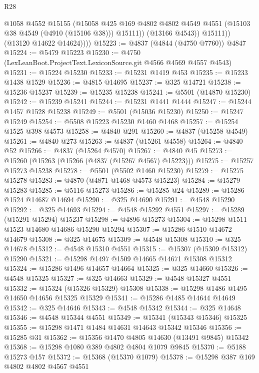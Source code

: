 \begin{lexlean}{R28}
\begin{coremodule}
                  @1058
                  @4552
                  @15155
                  (@15058
                    @425
                    @169
                    @4802
                    @4802
                    @4549
                    @4551
                    (@15103 @38 @4549 (@4910 (@15106 @38)))
                    @15111))
                (@13166 @4543))
              @15111))
          (@13120 @14622 @14624))))
@15223 := @4837 (@4844 (@4750 @7760)) @4847
@15224 := @5479 @15223
@15230 := @4750 (LexLeanBoot.ProjectText.LexiconSource.git @4566 @4569 @4557 @4543)
@15231 := @15224 @15230
@15233 := @15231 @1419 @453
@15235 := @15233 @1438 @1529
@15236 := @4815 @14695
@15237 := @325 @14721
@15238 := @15236 @15237
@15239 := @15235 @15238
@15241 := @5501 (@14870 @15230)
@15242 := @15239 @15241
@15244 := @15231 @1441 @1444
@15247 := @15244 @1457 @1528 @15238
@15249 := @5501 (@15036 @15230)
@15250 := @15247 @15249
@15254 := @5508 @15223 @15230 @1460 @1468
@15257 := @15254 @1525 @398 @4573
@15258 := @4840 @291
@15260 := @4837 (@15258 @4549)
@15261 := @4840 @273
@15263 := @4837 (@15261 @4558)
@15264 := @4840 @52
@15266 := @4837 (@15264 @4570)
@15267 := @4840 @45
@15273 := @15260 (@15263 (@15266 (@4837 (@15267 @4567) @15223)))
@15275 := @15257 @15273 @15238
@15278 := @5501 (@5502 @1460 @15230)
@15279 := @15275 @15278
@15283 := @4870 (@4871 @1468 @4573 @15223)
@15284 := @15279 @15283
@15285 := @5116 @15273
@15286 := @15285 @24
@15289 := @15286 @1524 @14687 @14694
@15290 := @325 @14690
@15291 := @4548 @15290
@15292 := @325 @14693
@15294 := @4548 @15292 @4551
@15297 := @15289 (@15291 @15294) @15237
@15298 := @4896 @15273
@15304 := @15298 @1511 @1523 @14680 @14686 @15290 @15294
@15307 := @15286 @1510 @14672 @14679
@15308 := @325 @14675
@15309 := @4548 @15308
@15310 := @325 @14678
@15312 := @4548 @15310 @4551
@15315 := @15307 (@15309 @15312) @15290
@15321 := @15298 @1497 @1509 @14665 @14671 @15308 @15312
@15324 := @15286 @1496 @14657 @14664
@15325 := @325 @14660
@15326 := @4548 @15325
@15327 := @325 @14663
@15329 := @4548 @15327 @4551
@15332 := @15324 (@15326 @15329) @15308
@15338 := @15298 @1486 @1495 @14650 @14656 @15325 @15329
@15341 := @15286 @1485 @14644 @14649
@15342 := @325 @14646
@15343 := @4548 @15342
@15344 := @325 @14648
@15346 := @4548 @15344 @4551
@15349 := @15341 (@15343 @15346) @15325
@15355 := @15298 @1471 @1484 @14631 @14643 @15342 @15346
@15356 := @15285 @31
@15362 := @15356 @1470 @4805 @14630 (@13491 @9845) @15342
@15368 := @15298 @1080 @389 @4802 @4804 @1079 @9845
@15370 := @5188 @15273 @157
@15372 := @15368 (@15370 @1079)
@15378 := @15298 @387 @169 @4802 @4802 @4567 @4551

\end{coremodule}
\end{lexlean}
